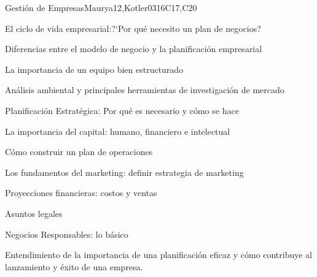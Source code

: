 \begin{syllabus}
\begin{unit}{Gestión de Empresas}{}{Maurya12,Kotler03}{16}{C17,C20}
\begin{topics}
      \item El ciclo de vida empresarial:?`Por qué necesito un plan de negocios?
      \item Diferencias entre el modelo de negocio y la planificación empresarial
      \item La importancia de un equipo bien estructurado
      \item Análisis ambiental y principales herramientas de investigación de mercado
      \item Planificación Estratégica: Por qué es necesario y cómo se hace
      \item La importancia del capital: humano, financiero e intelectual
      \item Cómo construir un plan de operaciones
      \item Los fundamentos del marketing: definir estrategia de marketing
      \item Proyecciones financieras: costos y ventas
      \item Asuntos legales
      \item Negocios Responsables: lo básico
\end{topics}

\begin{learningoutcomes}
   \item Entendimiento de la importancia de una planificación eficaz y cómo contribuye al lanzamiento y éxito de una empresa.
\end{learningoutcomes}
\end{unit}

\begin{coursebibliography}
\end{coursebibliography}

\end{syllabus}
